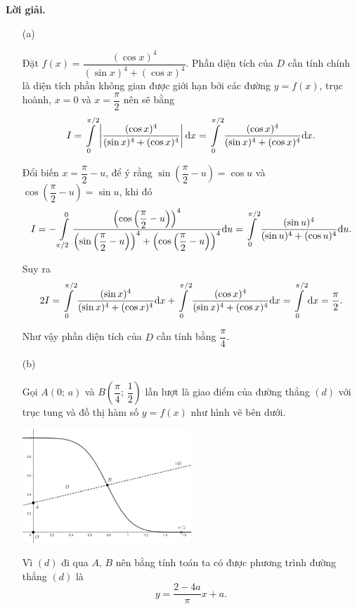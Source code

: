 \textbf{Lời giải. }

\begin{enumerate}
    \item[(a)] {Đặt $f(x) = \dfrac{(\cos x)^4}{(\sin x)^4 + (\cos x)^4}$. Phần diện tích của $D$ cần tính chính là diện tích phần không gian được giới hạn bởi các đường $y = f(x)$, trục hoành, $x = 0$ và $x = \dfrac{\pi}{2}$ nên sẽ bằng 
    $$I = \int\displaylimits_{0}^{\pi/2}\left|\dfrac{(\cos x)^4}{(\sin x)^4 + (\cos x)^4}\right|\mathrm{d}x = \int\displaylimits_{0}^{\pi/2}\dfrac{(\cos x)^4}{(\sin x)^4 + (\cos x)^4}\mathrm{d}x.$$
    
    Đổi biến $x = \dfrac{\pi}{2} - u$, để ý rằng $\sin\left(\dfrac{\pi}{2}-u\right) = \cos u$ và $\cos\left(\dfrac{\pi}{2}-u\right) = \sin u$, khi đó $$I = -\int\displaylimits_{\pi/2}^{0}\dfrac{\left(\cos \left(\dfrac{\pi}{2}-u\right)\right)^4}{\left(\sin \left(\dfrac{\pi}{2}-u\right)\right)^4 + \left(\cos \left(\dfrac{\pi}{2}-u\right)\right)^4}\mathrm{d}u = \int\displaylimits_{0}^{\pi/2}\dfrac{(\sin u)^4}{(\sin u)^4 + (\cos u)^4}\mathrm{d}u.$$
    
    Suy ra $$2I = \int\displaylimits_{0}^{\pi/2}\dfrac{(\sin x)^4}{(\sin x)^4 + (\cos x)^4}\mathrm{d}x + \int\displaylimits_{0}^{\pi/2}\dfrac{(\cos x)^4}{(\sin x)^4 + (\cos x)^4}\mathrm{d}x = \int\displaylimits_{0}^{\pi/2}\mathrm{d}x = \dfrac{\pi}{2}.$$
    
    Như vậy phần diện tích của $D$ cần tính bằng $\dfrac{\pi}{4}$.}
    \item[(b)] {Gọi $A(0;\,a)$ và $B\left(\dfrac{\pi}{4};\,\dfrac{1}{2}\right)$ lần lượt là giao điểm của đường thẳng $(d)$ với trục tung và đồ thị hàm số $y = f(x)$ như hình vẽ bên dưới.
    
    \begin{center}
        \includegraphics[width=0.5\textwidth]{Figures/06.png}
    \end{center}
    
    Vì $(d)$ đi qua $A,\,B$ nên bằng tính toán ta có được phương trình đường thẳng $(d)$ là $$y = \dfrac{2-4a}{\pi}x + a.$$
    
}
\end{enumerate}
